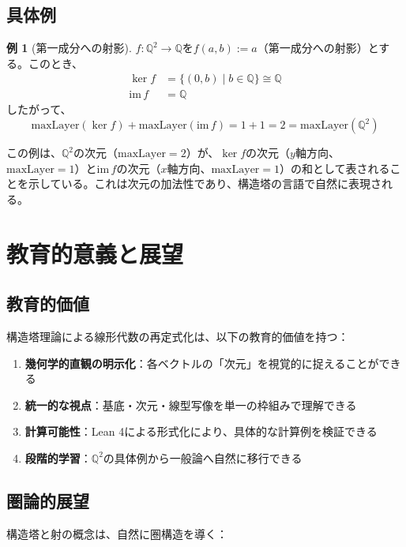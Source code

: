 \documentclass[a4paper,11pt]{ltjsarticle}
\theoremstyle{definition}
\newtheorem{example}[definition]{例}
\begin{document}
\subsection{具体例}

\begin{example}[第一成分への射影]
$f : \mathbb{Q}^2 \to \mathbb{Q}$を$f(a, b) := a$（第一成分への射影）とする。このとき、
\begin{align*}
\ker f &= \{(0, b) \mid b \in \mathbb{Q}\} \cong \mathbb{Q} \\
\mathrm{im}\, f &= \mathbb{Q}
\end{align*}
したがって、
\[
\mathrm{maxLayer}(\ker f) + \mathrm{maxLayer}(\mathrm{im}\, f) = 1 + 1 = 2 = \mathrm{maxLayer}(\mathbb{Q}^2)
\]
\end{example}

この例は、$\mathbb{Q}^2$の次元（$\mathrm{maxLayer} = 2$）が、$\ker f$の次元（$y$軸方向、$\mathrm{maxLayer} = 1$）と$\mathrm{im}\, f$の次元（$x$軸方向、$\mathrm{maxLayer} = 1$）の和として表されることを示している。これは次元の加法性であり、構造塔の言語で自然に表現される。

\section{教育的意義と展望}

\subsection{教育的価値}

構造塔理論による線形代数の再定式化は、以下の教育的価値を持つ：

\begin{enumerate}
  \item \textbf{幾何学的直観の明示化}：各ベクトルの「次元」を視覚的に捉えることができる
  \item \textbf{統一的な視点}：基底・次元・線型写像を単一の枠組みで理解できる
  \item \textbf{計算可能性}：Lean 4による形式化により、具体的な計算例を検証できる
  \item \textbf{段階的学習}：$\mathbb{Q}^2$の具体例から一般論へ自然に移行できる
\end{enumerate}

\subsection{圏論的展望}

構造塔と射の概念は、自然に圏構造を導く：
\end{document}

